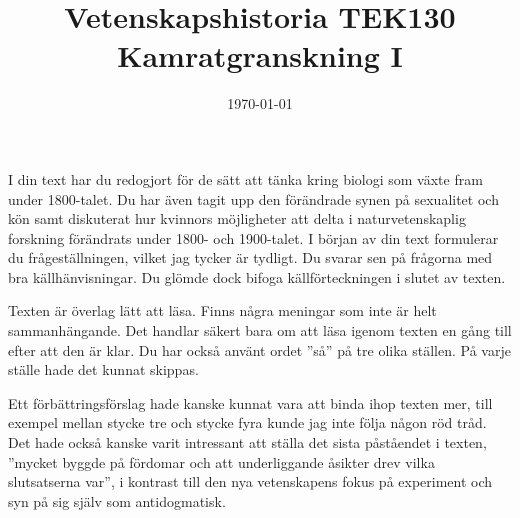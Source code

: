 \documentclass[a4paper, 11pt]{article}
\title{Vetenskapshistoria TEK130\\ Kamratgranskning I}
\author{}
\date{\today}
\begin{document}
\maketitle


I din text har du redogjort för de sätt att tänka kring biologi som växte fram under 1800-talet. Du har även tagit upp den förändrade synen på sexualitet och kön samt diskuterat hur kvinnors möjligheter att delta i naturvetenskaplig forskning förändrats under 1800- och 1900-talet. I början av din text formulerar du frågeställningen, vilket jag tycker är tydligt. Du svarar sen på frågorna med bra källhänvisningar. Du glömde dock bifoga källförteckningen i slutet av texten.

Texten är överlag lätt att läsa. Finns några meningar som inte är helt sammanhängande. Det handlar säkert bara om att läsa igenom texten en gång till efter att den är klar. Du har också använt ordet ''så'' på tre olika ställen. På varje ställe hade det kunnat skippas.

Ett förbättringsförslag hade kanske kunnat vara att binda ihop texten mer, till exempel mellan stycke tre och stycke fyra kunde jag inte följa någon röd tråd. Det hade också kanske varit intressant att ställa det sista påståendet i texten, ''mycket byggde på fördomar och att underliggande åsikter drev vilka slutsatserna var'', i kontrast till den nya vetenskapens fokus på experiment och syn på sig själv som antidogmatisk.
\end{document}
